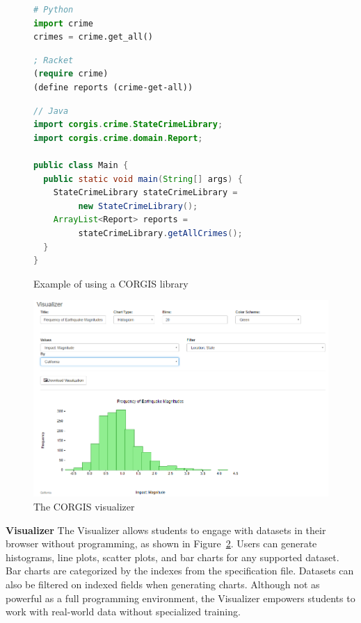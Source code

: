 \documentclass{sig-alternate}
\begin{document}
\begin{figure}[hb!]
\begin{lstlisting}[language=Python,basicstyle=\scriptsize]
# Python
import crime
crimes = crime.get_all()
\end{lstlisting}
\begin{lstlisting}[language=Lisp,basicstyle=\scriptsize]
; Racket
(require crime)
(define reports (crime-get-all))
\end{lstlisting}
\begin{lstlisting}[language=Java,basicstyle=\scriptsize]
// Java
import corgis.crime.StateCrimeLibrary;
import corgis.crime.domain.Report;

public class Main {
  public static void main(String[] args) {
    StateCrimeLibrary stateCrimeLibrary = 
         new StateCrimeLibrary();
    ArrayList<Report> reports = 
         stateCrimeLibrary.getAllCrimes();
  }
}
\end{lstlisting}
\vspace{-\medskipamount}
\caption{Example of using a CORGIS library}
\label{fig:example-usage}
\end{figure}

\begin{figure}[ht!]
    \centering
    \includegraphics[width=.47\textwidth]{graphics/visualizer}
    \vspace{-\smallskipamount}
    \caption{The CORGIS visualizer}
    \label{fig:visualizer}
    \vspace{-\medskipamount}
\end{figure}

\newpage
\textbf{Visualizer} The Visualizer allows students to engage with datasets in their browser without programming, as shown in Figure~\ref{fig:visualizer}.
Users can generate histograms, line plots, scatter plots, and bar charts for any supported dataset.
Bar charts are categorized by the indexes from the specification file.
Datasets can also be filtered on indexed fields when generating charts.
Although not as powerful as a full programming environment, the Visualizer empowers students to work with real-world data without specialized training.
\end{document}
